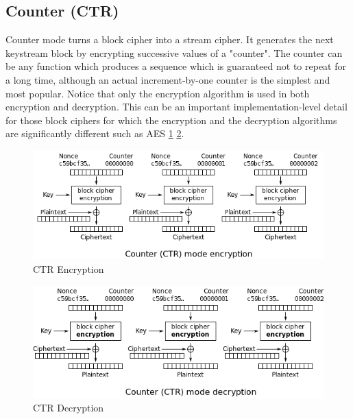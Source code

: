 \subsection{Counter (CTR)}

Counter mode turns a block cipher into a stream cipher. It generates the next keystream block by encrypting successive values of a "counter". The counter can be any function which produces a sequence which is guaranteed not to repeat for a long time, although an actual increment-by-one counter is the simplest and most popular. Notice that only the encryption
algorithm is used in both encryption and decryption. This can be an important implementation-level detail for those block ciphers for which the encryption and the decryption algorithms are significantly different such as AES \ref{fig:CTR_Encryption} \ref{fig:CTR_Decryption}.

\begin{figure}
	\centering
	\includegraphics[width=0.7\linewidth]{Images/Chapter3/CTR_Encryption}
	\caption{CTR Encryption}
	\label{fig:CTR_Encryption}
\end{figure}

\begin{figure}
	\centering
	\includegraphics[width=0.7\linewidth]{Images/Chapter3/CTR_Decryption}
	\caption{CTR Decryption}
	\label{fig:CTR_Decryption}
\end{figure}

